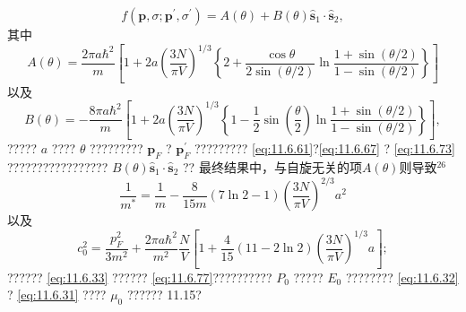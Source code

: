 \begin{equation}\tag{11.6.74}\label{eq:11.6.74}
f ( \pmb { p } , \sigma ; \pmb { p } ^{\prime} , \sigma ^{\prime} ) = A ( \theta ) + B ( \theta ) \hat { \pmb { s } } _ { 1 } \cdot \hat { \pmb { s } } _ { 2 } ,
\end{equation}
其中
\begin{equation}\tag{11.6.75}\label{eq:11.6.75}
A ( \theta ) = \frac { 2 \pi a \hbar ^{2} } { m } \left[ 1 + 2 a \left( \frac { 3 N } { \pi V } \right) ^{1 / 3} \left\{ 2 + \frac { \cos \theta } { 2 \sin ( \theta / 2 ) } \ln \frac { 1 + \sin ( \theta / 2 ) } { 1 - \sin ( \theta / 2 ) } \right\} \right]
\end{equation}
以及
\begin{equation}\tag{11.6.76}\label{eq:11.6.76}
B ( \theta ) = - \frac { 8 \pi a \hbar ^{2} } { m } \left[ 1 + 2 a \left( \frac { 3 N } { \pi V } \right) ^{1 / 3} \left\{ 1 - \frac { 1 } { 2 } \sin \left( \frac { \theta } { 2 } \right) \ln \frac { 1 + \sin ( \theta / 2 ) } { 1 - \sin ( \theta / 2 ) } \right\} \right] ,
\end{equation}
????? \(a\) ???? \(\theta\) ????????? \(\boldsymbol{p}_{F}\) ? \(\boldsymbol{p}_{F}^{\prime}\) ????????? \autoref{eq:11.6.61}?\autoref{eq:11.6.67} ? \autoref{eq:11.6.73} ????????????????? \(B(\theta)\hat{\mathbf{s}}_{1}\cdot\hat{\mathbf{s}}_{2}\) ??
最终结果中，与自旋无关的项\(A(\theta)\)则导致\(^{26}\)
\begin{equation}\tag{11.6.77}\label{eq:11.6.77}
\frac { 1 } { m ^{*} } = \frac { 1 } { m } - \frac { 8 } { 15 m } ( 7 \ln 2 - 1 ) \left( \frac { 3 N } { \pi V } \right) ^{2 / 3} a ^{2}
\end{equation}
以及
\begin{equation}\tag{11.6.78}\label{eq:11.6.78}
c _ { 0 } ^{2} = \frac { p _ { F } ^{2} } { 3 m ^{2} } + \frac { 2 \pi a \hbar ^{2} } { m ^{2} } \frac { N } { V } \left[ 1 + \frac { 4 } { 15 } ( 11 - 2 \ln 2 ) \left( \frac { 3 N } { \pi V } \right) ^{1 / 3} a \right] ;
\end{equation}
?????? \autoref{eq:11.6.33} ?????? \autoref{eq:11.6.77}?????????? \(P_0\) ????? \(E_0\) ???????? \autoref{eq:11.6.32} ? \autoref{eq:11.6.31} ???? \(\mu_0\) ?????? 11.15?
